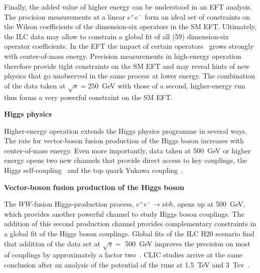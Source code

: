 Finally, the added value of higher energy can be understood in an EFT analysis. The
precision measurements at a linear $e^+e^-$ form an ideal set of constraints
on the Wilson coefficients of the dimension-six operators in the SM EFT. Ultimately,
the ILC data may allow to constrain a global fit of all (59) dimension-six operator
coefficients. In the EFT the impact of certain operators~\cite{Durieux:2018tev,Barklow:2017suo}
grows strongly with center-of-mass energy. Precision measurements in high-energy operation
therefore provide tight constraints on the SM EFT and may reveal hints of new physics
that go unobserved in the same process at lower energy.
The combination of the data taken at $\sqrt{s}= 250$~GeV with those of a second,
higher-energy run thus forms a very powerful constraint on the SM EFT.




{\bf Higgs physics}

Higher-energy operation extends the Higgs physics programme in several ways.
The rate for vector-boson fusion production of the Higgs boson increases with
center-of-mass energy. Even more importantly, data taken
at 500~GeV or higher energy opens two new channels that provide direct
access to key couplings, the Higgs self-coupling~\cite{Barklow:2017awn}
and the top quark Yukawa coupling~\cite{Yonamine:2011jg}.

{\bf Vector-boson fusion production of the Higgs boson}

The $WW$-fusion Higgs-production process,
$e^+e^- \rightarrow \nu \bar{\nu} h$, opens up at 500~GeV, which
provides another powerful channel to study Higgs boson couplings. The
addition of this second production channel provides complementary
constraints in a global fit of the Higgs boson couplings.
Global fits of the ILC H20 scenario find that addition of the data
set at $\sqrt{s}=$ 500~GeV improves the precision on most of
couplings by approximately a factor two~\cite{Barklow:2017suo}.
CLIC studies arrive at the same conclusion after an analysis of
the potential of the runs at 1.5~TeV  and
3~Tev~\cite{Abramowicz:2016zbo}.

